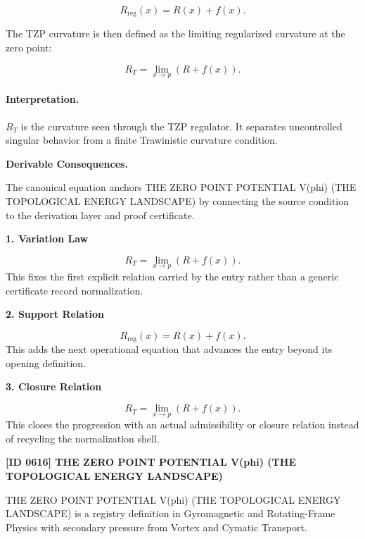 \begin{equation}
R_{\mathrm{reg}}(x)=R(x)+f(x).
\end{equation}

The TZP curvature is then defined as the limiting regularized curvature at the zero point:

\begin{equation}
\boxed{
R_T
=
\lim_{x\to p}
\left(
R+f(x)
\right).
}
\end{equation}

\paragraph{Interpretation.}
$R_T$ is the curvature seen through the TZP regulator. It separates uncontrolled singular behavior from a finite Trawinistic curvature condition.

\par\vspace{0.35em}
\noindent\textbf{Derivable Consequences.}\quad
\begingroup
\footnotesize
\raggedright
The canonical equation anchors THE ZERO POINT POTENTIAL V(phi) (THE TOPOLOGICAL ENERGY LANDSCAPE) by connecting the source condition to the derivation layer and proof certificate.
\par\endgroup

\noindent\textbf{1. Variation Law}\par
\[
R_T = \lim_{x\to p} \left( R+f(x) \right).
\]
\noindent This fixes the first explicit relation carried by the entry rather than a generic certificate record normalization.\par
\noindent\textbf{2. Support Relation}\par
\[
R_{\mathrm{reg}}(x)=R(x)+f(x).
\]
\noindent This adds the next operational equation that advances the entry beyond its opening definition.\par
\noindent\textbf{3. Closure Relation}\par
\[
\boxed{ R_T = \lim_{x\to p} \left( R+f(x) \right). }
\]
\noindent This closes the progression with an actual admissibility or closure relation instead of recycling the normalization shell.\par

\clearpage
\noindent\textbf{[ID 0616] THE ZERO POINT POTENTIAL V(phi) (THE TOPOLOGICAL ENERGY LANDSCAPE)}\par
\vspace{0.35em}
\begingroup\small
{}
THE ZERO POINT POTENTIAL V(phi) (THE TOPOLOGICAL ENERGY LANDSCAPE) is a registry definition in Gyromagnetic and Rotating-Frame Physics with secondary pressure from Vortex and Cymatic Transport.

